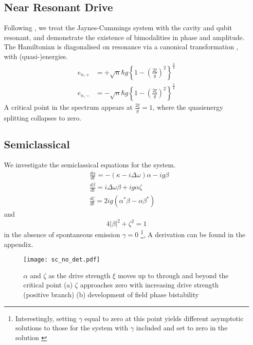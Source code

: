 \subsection{Near Resonant Drive}
Following \cite{Carmichael2015}, we treat the Jaynes-Cummings system with the cavity and qubit resonant, and demonstrate the existence of bimodalities in phase and amplitude.
The Hamiltonian is diagonalised on resonance via a canonical transformation \cite{Alsing1992}, with (quasi-)energies.
\begin{align}
  e_{n, +} &= + \sqrt{n} \hbar g {\left \{1 - {\left ({\frac{2\xi}{g}} \right )}^2 \right \}}^{\frac{3}{4}} \\
  e_{n, -} &= - \sqrt{n} \hbar g {\left \{1 - {\left ({\frac{2\xi}{g}} \right )}^2 \right \}}^{\frac{3}{4}}
\end{align}
A critical point in the spectrum appears at $\frac{2\xi}{g} = 1$, where the quasienergy splitting collapses to zero.
\subsection{Semiclassical}
We investigate the semiclassical equations for the system.
\begin{align}
  &\frac{d \alpha}{dt} = -(\kappa -i \Delta \omega) \alpha-ig \beta \label{eq:alpha}\\
  &\frac{d \beta}{dt} = i \Delta \omega \beta +ig \alpha \zeta \label{eq:beta}\\
  &\frac{d \zeta}{dt} = 2 i g(\alpha^* \beta -\alpha \beta^*)\label{eq:zeta}
\end{align}
and
\begin{equation}
  4|\beta|^2+\zeta^2 = 1 \label{eq:pseudospin}
\end{equation}
in the absence of spontaneous emission $\gamma=0$
\footnote{ Interestingly, setting $\gamma$ equal to zero at this point yields different asymptotic solutions to those for the system with $\gamma$ included and set to zero in the solution \cite{Alsing1990}},
A derivation can be found in the appendix.
\begin{figure}[!htb]
  \texttt{[image: sc\_no\_det.pdf]}
  \caption{$\alpha$ and $\zeta$ as the drive strength $\xi$ moves up to through and beyond the critical point (a) $\zeta$ approaches zero with increasing drive strength (positive branch)\label{fig:zeta} (b) development of field phase bistability}\label{fig:alpha}
  \label{fig:sc_no_det}
\end{figure}
